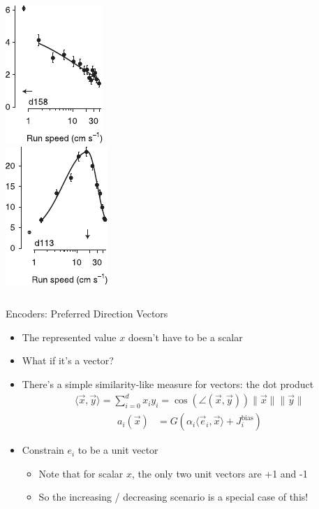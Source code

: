 \documentclass[handout,aspectratio=169]{beamer}
\begin{document}
\begin{frame}
\begin{columns}
		\includegraphics[scale=0.75]{media/saleem_et_al_tuning_curves_c.pdf} \\
		\includegraphics[scale=0.75]{media/saleem_et_al_tuning_curves_b.pdf}
	\end{columns}
\end{frame}

\begin{frame}{Encoders: Preferred Direction Vectors}
	\begin{itemize}
		\item The represented value $x$ doesn't have to be a scalar
		\item What if it's a vector?
		\item<2-> There's a simple similarity-like measure for vectors: the dot product
		\begin{align*}
			\langle \vec x, \vec y \rangle = \sum_{i = 0}^d x_i y_i = \cos(\angle(\vec x, \vec y)) \| \vec x\| \| \vec y\|
		\end{align*}					
		\begin{align*}
			a_i(\vec x) &= G(\alpha_i \langle \vec e_i, \vec x \rangle + J^\mathrm{bias}_i)			
		\end{align*}
		\item<2-> Constrain $e_i$ to be a unit vector
		\begin{itemize}
			\item Note that for scalar $x$, the only two unit vectors are +1 and -1
			\item So the increasing / decreasing scenario is a special case of this!
		\end{itemize}					
	\end{itemize}
\end{frame}
\end{document}
